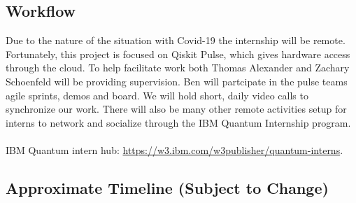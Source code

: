 \documentclass[11pt, letterpaper]{article}
\begin{document}
\subsection{Workflow}
Due to the nature of the situation with Covid-19 the internship will be remote.
Fortunately, this project is focused on Qiskit Pulse, which gives hardware access
through the cloud. To help facilitate work both Thomas Alexander and
Zachary Schoenfeld will be providing supervision. Ben will partcipate in the
pulse teams agile sprints, demos and board. We will hold short, daily video
calls to synchronize our work. There will also be many other remote activities
setup for interns to network and socialize through the IBM Quantum Internship
program.\\
%
\\
%
IBM Quantum intern hub: \url{https://w3.ibm.com/w3publisher/quantum-interns}.

\subsection{Approximate Timeline (Subject to Change)}
\end{document}
